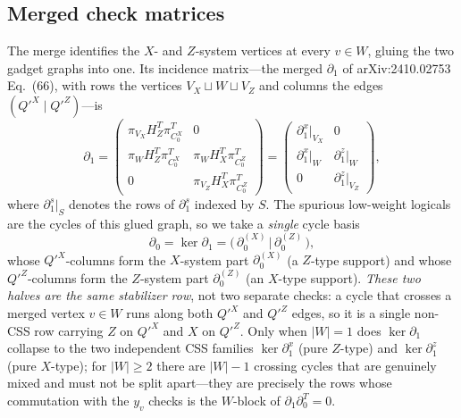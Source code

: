 \documentclass[a4paper, 12pt]{article}
\begin{document}
\subsection{Merged check matrices}
The merge identifies the $X$- and $Z$-system vertices at every $v\in W$, gluing the two gadget
graphs into one. Its incidence matrix---the merged $\partial_1$ of arXiv:2410.02753 Eq.~(66),
with rows the vertices $V_X\sqcup W\sqcup V_Z$ and columns the edges $(Q'^X \mid Q'^Z)$---is
\begin{equation}
\partial_1 =
\begin{pmatrix}
\pi_{V_X} H_Z^T \pi_{C_0^X}^T & 0 \\
\pi_{W}   H_Z^T \pi_{C_0^X}^T & \pi_{W}   H_X^T \pi_{C_0^Z}^T \\
0 & \pi_{V_Z} H_X^T \pi_{C_0^Z}^T
\end{pmatrix}
=
\begin{pmatrix}
\partial_1^{x}|_{V_X} & 0 \\
\partial_1^{x}|_{W}   & \partial_1^{z}|_{W} \\
0 & \partial_1^{z}|_{V_Z}
\end{pmatrix},
\end{equation}
where $\partial_1^{s}|_{S}$ denotes the rows of $\partial_1^{s}$ indexed by $S$. The spurious
low-weight logicals are the cycles of this glued graph, so we take a \emph{single} cycle basis
\begin{equation}
\partial_0 = \ker \partial_1
= \bigl(\, \partial_0^{(X)} \,\big|\, \partial_0^{(Z)} \,\bigr),
\end{equation}
whose $Q'^X$-columns form the $X$-system part $\partial_0^{(X)}$ (a $Z$-type support) and whose
$Q'^Z$-columns form the $Z$-system part $\partial_0^{(Z)}$ (an $X$-type support).
\emph{These two halves are the same stabilizer row}, not two separate checks: a cycle that
crosses a merged vertex $v\in W$ runs along both $Q'^X$ and $Q'^Z$ edges, so it is a single
non-CSS row carrying $Z$ on $Q'^X$ and $X$ on $Q'^Z$. Only when $|W|=1$ does $\ker \partial_1$
collapse to the two independent CSS families $\ker\partial_1^{x}$ (pure $Z$-type) and
$\ker\partial_1^{z}$ (pure $X$-type); for $|W|\geq 2$ there are $|W|-1$ crossing cycles that are
genuinely mixed and must not be split apart---they are precisely the rows whose commutation with
the $y_v$ checks is the $W$-block of $\partial_1\partial_0^T = 0$.
\end{document}
